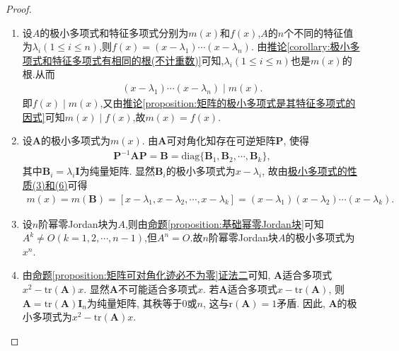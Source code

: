 \documentclass[../../main.tex]{subfiles}%
\begin{document}
\begin{proof}
\begin{enumerate}[(1)]
\item 设$A$的极小多项式和特征多项式分别为$m(x)$和$f(x)$,$A$的$n$个不同的特征值为$\lambda_i(1\leqslant  i\leqslant  n)$,则$f(x)=(x-\lambda_1)\cdots(x-\lambda_n)$.
由\hyperref[corollary:极小多项式和特征多项式有相同的根(不计重数)]{推论\ref{corollary:极小多项式和特征多项式有相同的根(不计重数)}}可知,$\lambda_i(1\leqslant  i\leqslant  n)$也是$m(x)$的根.从而
\begin{align*}
(x-\lambda_1)\cdots(x-\lambda_n)\mid m(x).
\end{align*}
即$f(x)\mid m(x)$,又由\hyperref[proposition:矩阵的极小多项式是其特征多项式的因式]{推论\ref{proposition:矩阵的极小多项式是其特征多项式的因式}}可知$m(x)\mid f(x)$,故$m(x)=f(x)$.

\item 设\(\boldsymbol{A}\)的极小多项式为\(m(x)\). 由\(\boldsymbol{A}\)可对角化知存在可逆矩阵\(\boldsymbol{P}\), 使得
\begin{align*}
\boldsymbol{P}^{-1}\boldsymbol{A}\boldsymbol{P} = \boldsymbol{B} = \mathrm{diag}\{\boldsymbol{B}_1,\boldsymbol{B}_2,\cdots,\boldsymbol{B}_k\},
\end{align*}
其中\(\boldsymbol{B}_i = \lambda_i\boldsymbol{I}\)为纯量矩阵. 显然\(\boldsymbol{B}_i\)的极小多项式为\(x - \lambda_i\), 故由\hyperref[proposition:极小多项式的性质]{极小多项式的性质(3)和(6)}可得
\begin{align*}
m(x) = m(\boldsymbol{B})= [x - \lambda_1,x - \lambda_2,\cdots,x - \lambda_k] = (x - \lambda_1)(x - \lambda_2)\cdots(x - \lambda_k). 
\end{align*} 

\item 设\(n\)阶幂零Jordan块为$A$,则由\hyperref[proposition:基础幂零Jordan块]{命题\ref{proposition:基础幂零Jordan块}}可知$A^k\ne O(k=1,2,\cdots,n-1)$,但$A^n=O$.故\(n\)阶幂零Jordan块$A$的极小多项式为$x^n$.

\item 由\hyperref[proposition:矩阵可对角化迹必不为零]{命题\ref{proposition:矩阵可对角化迹必不为零}证法二}可知, \(\boldsymbol{A}\)适合多项式\(x^2 - \mathrm{tr}(\boldsymbol{A})x\). 显然\(\boldsymbol{A}\)不可能适合多项式\(x\). 若\(\boldsymbol{A}\)适合多项式\(x - \mathrm{tr}(\boldsymbol{A})\), 则\(\boldsymbol{A} = \mathrm{tr}(\boldsymbol{A})\boldsymbol{I}_n\)为纯量矩阵, 其秩等于\(0\)或\(n\), 这与\(\mathrm{r}(\boldsymbol{A}) = 1\)矛盾. 因此, \(\boldsymbol{A}\)的极小多项式为\(x^2 - \mathrm{tr}(\boldsymbol{A})x\). 
\end{enumerate}
\end{proof}
\end{document}
